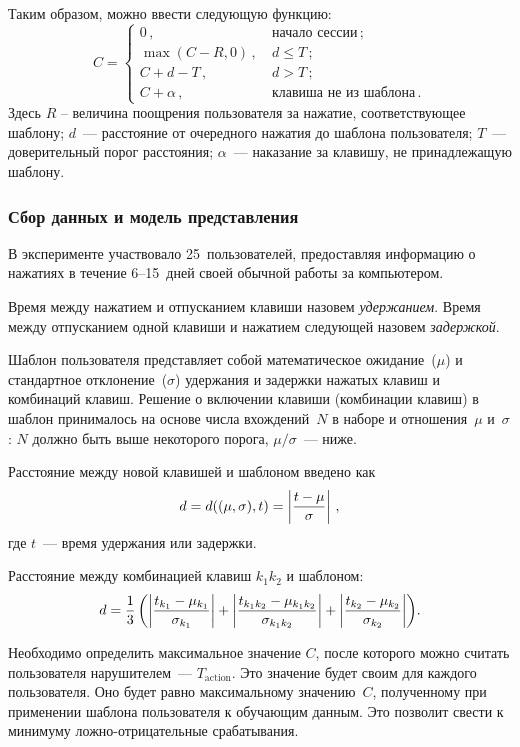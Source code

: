 \begin{multicols}{2}
Таким образом, можно ввести следующую функцию:
$$ C =\begin{cases}
    0\,, &\ \mbox{начало\ сессии}\,; \\
    \max(C - R, 0)\,, &\ d \le T\,; \\
    C + d - T\,, &\ d > T\,; \\
    C + \alpha\,, &\ \mbox{клавиша\ не\ из\ шаблона}\,.
\end{cases}
$$
Здесь $R$ -- величина поощрения пользователя за нажатие,
соответствующее шаблону; $d$~--- расстояние от очередного нажатия до
шаблона пользователя; $T$~--- доверительный порог расстояния;
$\alpha$~--- наказание за клавишу, не принадлежащую шаблону.

\subsubsection{Сбор данных и модель представления}

В эксперименте участвовало 25~пользователей, предоставляя информацию
о нажатиях в течение 6--15~дней своей обычной работы за компьютером.

Время между нажатием и отпусканием клавиши назовем
\textit{удержанием}. Время между отпусканием одной клавиши и
нажатием следующей назовем \textit{задержкой}.

Шаблон пользователя представляет собой математическое ожидание~($\mu$) 
и стандартное отклонение~($\sigma$) удержания и задержки
нажатых клавиш и комбинаций клавиш. Решение о включении клавиши
(комбинации клавиш) в шаблон принималось на основе числа вхождений~$N$ 
в наборе и отношения~$\mu$ и~$\sigma$: $N$ должно быть выше
некоторого порога, ${\mu}/{\sigma}$~--- ниже.

Расстояние между новой клавишей и шаблоном введено как
$$
d = d((\mu, \sigma), t) = \left|\displaystyle\frac{\displaystyle t - \mu\mathstrut}{\displaystyle \sigma\mathstrut}\right|\,,
$$
где $t$~--- время удержания или задержки.

Расстояние между комбинацией клавиш $k_1k_2$ и шаблоном:
$$
d = \displaystyle\frac{\displaystyle 1\mathstrut}{\displaystyle 3\mathstrut}  \left( \left|\displaystyle\frac{\displaystyle t_{k_1} - \mu_{k_1}\mathstrut}{\displaystyle \sigma_{k_1}\mathstrut}\right| + 
\left|\displaystyle\frac{\displaystyle t_{k_1 k_2} - \mu_{k_1 k_2}\mathstrut}{\displaystyle \sigma_{k_1 k_2}\mathstrut}\right| + 
\left|\displaystyle\frac{\displaystyle t_{k_2} - \mu_{k_2}\mathstrut}{\displaystyle \sigma_{k_2}\mathstrut}\right| \right)\!.
$$

Необходимо определить максимальное значение $C$, после которого
можно считать пользователя нарушителем~--- $T_{\mathrm{action}}$. Это
значение будет своим для каждого пользователя. Оно будет равно
максимальному значению~$C$, полученному при применении шаблона
пользователя к обучающим данным. Это позволит свести к минимуму
лож\-но-от\-ри\-ца\-тель\-ные срабатывания.


\end{multicols}
